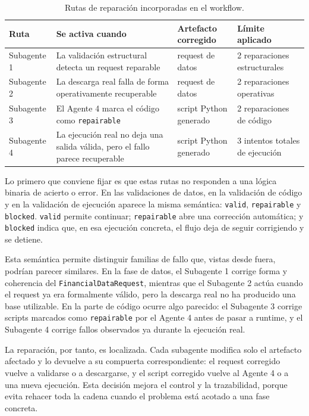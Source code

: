 \begin{table}[H]
\centering
\small
\begin{tabularx}{\textwidth}{L{0.15\textwidth}L{0.25\textwidth}L{0.24\textwidth}Y}
\toprule
\textbf{Ruta} & \textbf{Se activa cuando} & \textbf{Artefacto corregido} & \textbf{L\'imite aplicado} \\
\midrule
Subagente 1 & La validaci\'on estructural detecta un request reparable & request de datos & 2 reparaciones estructurales \\
Subagente 2 & La descarga real falla de forma operativamente recuperable & request de datos & 2 reparaciones operativas \\
Subagente 3 & El Agente 4 marca el c\'odigo como \texttt{repairable} & script Python generado & 2 reparaciones de c\'odigo \\
Subagente 4 & La ejecuci\'on real no deja una salida v\'alida, pero el fallo parece recuperable & script Python generado & 3 intentos totales de ejecuci\'on \\
\bottomrule
\end{tabularx}
\caption{Rutas de reparaci\'on incorporadas en el workflow.}
\label{tab:rutas_reparacion}
\end{table}

Lo primero que conviene fijar es que estas rutas no responden a una l\'ogica binaria de acierto o error. En las validaciones de datos, en la validaci\'on de
c\'odigo y en la validaci\'on de ejecuci\'on aparece la misma sem\'antica: \texttt{valid}, \texttt{repairable} y \texttt{blocked}. \texttt{valid}
permite continuar; \texttt{repairable} abre una correcci\'on autom\'atica; y \texttt{blocked} indica que, en esa ejecuci\'on concreta, el flujo deja de
seguir corrigiendo y se detiene.

Esta sem\'antica permite distinguir familias de fallo que, vistas desde fuera, podr\'ian parecer similares. En la fase de datos, el Subagente 1 corrige forma y
coherencia del \texttt{FinancialDataRequest}, mientras que el Subagente 2 act\'ua cuando el request ya era formalmente v\'alido, pero la descarga real no ha
producido una base utilizable. En la parte de c\'odigo ocurre algo parecido: el Subagente 3 corrige scripts marcados como \texttt{repairable} por el Agente 4
antes de pasar a runtime, y el Subagente 4 corrige fallos observados ya durante la ejecuci\'on real.

La reparaci\'on, por tanto, es localizada. Cada subagente modifica solo el artefacto afectado y lo devuelve a su compuerta correspondiente: el request
corregido vuelve a validarse o a descargarse, y el script corregido vuelve al Agente 4 o a una nueva ejecuci\'on. Esta decisi\'on mejora el control y la
trazabilidad, porque evita rehacer toda la cadena cuando el problema est\'a acotado a una fase concreta.

